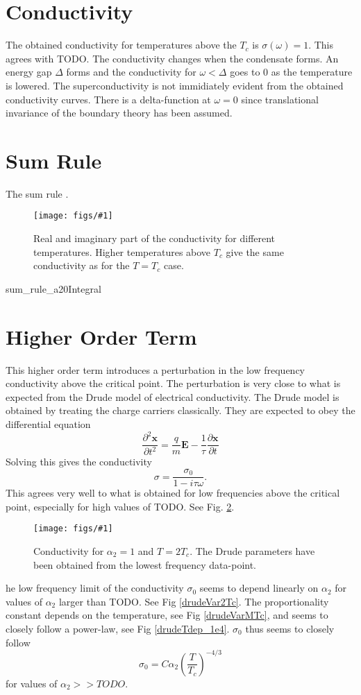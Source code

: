 \documentclass[12pt]{report}
\renewcommand{\i}{\ensuremath{i}}
\newcommand{\fig}[3]{
\begin{figure}
\centering
\texttt{[image: figs/\#1]}
\caption{#2}
\end{figure}
}
\begin{document}
\section{Conductivity}
The obtained conductivity for temperatures above the $T_c$ is $\sigma(\omega)=1$. This agrees with TODO. The conductivity changes when the condensate forms. An energy gap $\Delta$ forms and the conductivity for $\omega<\Delta$ goes to 0 as the temperature is lowered. The superconductivity is not immidiately evident from the obtained conductivity curves. There is a delta-function at $\omega=0$ since translational invariance of the boundary theory has been assumed.

\section{Sum Rule}
The sum rule \cite{PhysRev.109.1398}.

\fig{cond_Ts}{Real and imaginary part of the conductivity for different temperatures. Higher temperatures above $T_c$ give the same conductivity as for the $T=T_c$ case. \label{cond_Ts}}

\fig{sum_rule_a20}{Integral}
\section{Higher Order Term}
This higher order term introduces a perturbation in the low frequency conductivity above the critical point. The perturbation is very close to what is expected from the Drude model of electrical conductivity. The Drude model is obtained by treating the charge carriers classically. They are expected to obey the differential equation
\begin{equation}
 \frac{\partial^2\mathbf{x}}{\partial t^2}=\frac{q}{m}\mathbf{E}-\frac{1}{\tau}\frac{\partial\mathbf{x}}{\partial t}
\end{equation}
Solving this gives the conductivity
\begin{equation}
 \sigma=\frac{\sigma_0}{1-\i\tau\omega}.
\end{equation}
This agrees very well to what is obtained for low frequencies above the critical point, especially for high values of TODO. See Fig. \ref{drude}.

\fig{drude_2Tc_a21}{Conductivity for $\alpha_2=1$ and $T=2T_c$. The Drude parameters have been obtained from the lowest frequency data-point. \label{drude}}

The low frequency limit of the conductivity $\sigma_0$ seems to depend linearly on $\alpha_2$ for values of $\alpha_2$ larger than TODO. See Fig \ref{drudeVar2Tc}. The proportionality constant depends on the temperature, see Fig \ref{drudeVarMTc}, and seems to closely follow a power-law, see Fig \ref{drudeTdep_1e4}. $\sigma_0$ thus seems to closely follow
\begin{equation}
 \sigma_0=C\alpha_2\left(\frac{T}{T_c}\right)^{-4/3}
\end{equation}
for values of $\alpha_2>>TODO$.
\end{document}
